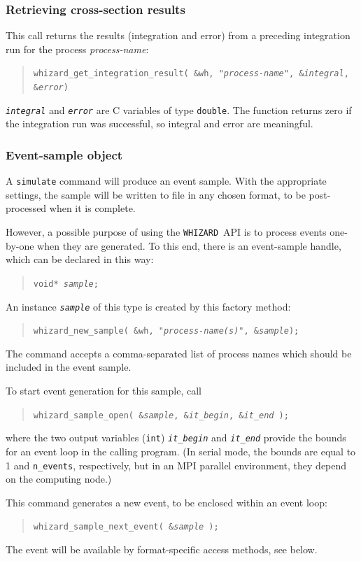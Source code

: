 \documentclass[12pt]{book}
\newcommand{\ttt}[1]{\texttt{#1}}
\newcommand{\whizard}{\ttt{WHIZARD}}
\begin{document}
\subsubsection{Retrieving cross-section results}
This call returns the results (integration and error) from a preceding
integration run for the process \textit{process-name}:
\begin{quote}
  \tt whizard\_get\_integration\_result( \&wh, "\textit{process-name}",
  \&\textit{integral}, \&\textit{error})
\end{quote}
\ttt{\it integral} and \ttt{\it error} are C variables of type \ttt{double}.
The function returns zero if the integration run was successful, so integral
and error are meaningful.

\subsubsection{Event-sample object}
A \ttt{simulate} command will produce an event sample.  With the appropriate
settings, the sample will be written to file in any chosen format, to be
post-processed when it is complete.

However, a possible purpose of using the \whizard\ API is to process events one-by-one
when they are generated.  To this end, there is an event-sample handle, which
can be declared in this way:
\begin{quote}
  \tt void* \textit{sample};
\end{quote}
An instance \ttt{\it sample} of this type is created by this factory method:
\begin{quote}
  \tt whizard\_new\_sample( \&wh, "\textit{process-name(s)}", \&\textit{sample});
\end{quote}
The command accepts a comma-separated list of process names which should be
included in the event sample.

To start event generation for this sample, call
\begin{quote}
  \tt whizard\_sample\_open( \&\textit{sample}, \&\textit{it\_begin},
  \&\textit{it\_end} );
\end{quote}
where the two output variables (\ttt{int}) \ttt{\it it\_begin} and
\ttt{\it it\_end}
provide the bounds for an event loop in the calling program.  (In serial mode,
the bounds are equal to 1 and \ttt{n\_events}, respectively, but in an MPI
parallel environment, they depend on the computing node.)

This command generates a new event, to be enclosed within an event loop:
\begin{quote}
  \tt whizard\_sample\_next\_event( \&\textit{sample} );
\end{quote}
The event will be available by format-specific access methods, see below.
\end{document}
